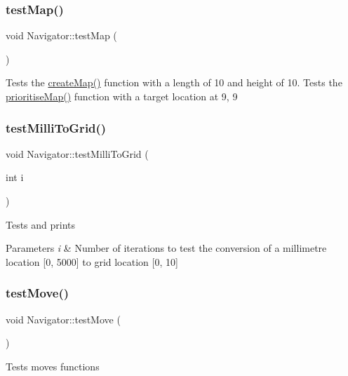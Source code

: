 \subsubsection{\texorpdfstring{test\+Map()}{testMap()}}
{\footnotesize\ttfamily void Navigator\+::test\+Map (\begin{DoxyParamCaption}{ }\end{DoxyParamCaption})}

Tests the \mbox{\hyperlink{class_navigator_a8b0cb171e3e3b16b206278fb23f624bc}{create\+Map()}} function with a length of 10 and height of 10. Tests the \mbox{\hyperlink{class_navigator_a8e5fe25410be1caacb0178e72cea97d5}{prioritise\+Map()}} function with a target location at 9, 9 \mbox{\label{class_navigator_ad24af0142a398b88f193941fcc776ddc}} 
\subsubsection{\texorpdfstring{test\+Milli\+To\+Grid()}{testMilliToGrid()}}
{\footnotesize\ttfamily void Navigator\+::test\+Milli\+To\+Grid (\begin{DoxyParamCaption}\item[{int}]{i }\end{DoxyParamCaption})}

Tests and prints


\begin{DoxyParams}{Parameters}
{\em i} & Number of iterations to test the conversion of a millimetre location \mbox{[}0, 5000\mbox{]} to grid location \mbox{[}0, 10\mbox{]} \\
\hline
\end{DoxyParams}
\mbox{\label{class_navigator_a8df511cb7ce67515d86201f017525be4}} 
\subsubsection{\texorpdfstring{test\+Move()}{testMove()}}
{\footnotesize\ttfamily void Navigator\+::test\+Move (\begin{DoxyParamCaption}{ }\end{DoxyParamCaption})}

Tests moves functions \mbox{\label{class_navigator_ae31be1ae0d17e7fc78aa7c6a4553fca2}} 
